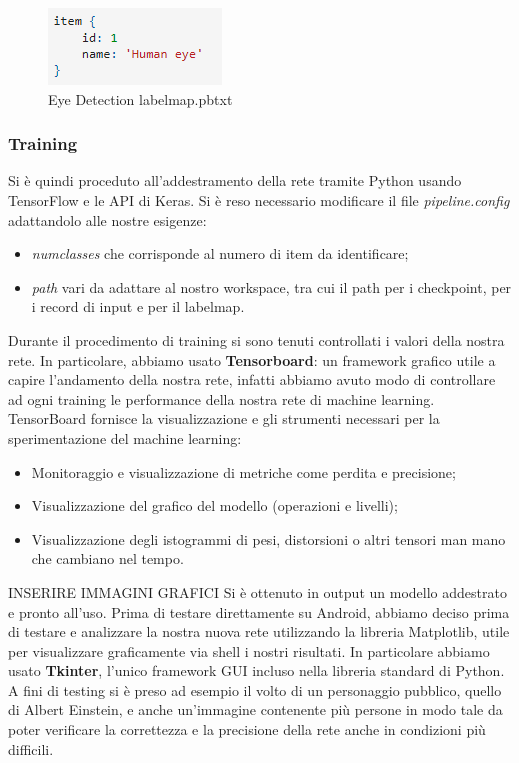 \documentclass[11pt]{article}
\begin{document}
\begin{figure}[h]
\caption{Eye Detection labelmap.pbtxt}
\centering
\includegraphics[scale=1]{img/item.png}
\end{figure}


\subsubsection{Training}
Si è quindi proceduto all’addestramento della rete tramite Python usando TensorFlow e le API di Keras. Si è reso necessario modificare il file \textit{pipeline.config} adattandolo alle nostre esigenze: 
\begin{itemize}
    \item \textit{numclasses} che corrisponde al numero di item da identificare;
    \item \textit{path} vari da adattare al nostro workspace, tra cui il path per i checkpoint, per i record di input e per il labelmap.
\end{itemize}
\newline
Durante il procedimento di training si sono tenuti controllati i valori della nostra rete. In particolare, abbiamo usato \textbf{Tensorboard}: un framework grafico utile a capire l'andamento della nostra rete, infatti abbiamo avuto modo di controllare ad ogni training le performance della nostra rete di machine learning.
\newline
TensorBoard fornisce la visualizzazione e gli strumenti necessari per la sperimentazione del machine learning:
\begin{itemize}
    \item Monitoraggio e visualizzazione di metriche come perdita e precisione;
    \item Visualizzazione del grafico del modello (operazioni e livelli);
    \item Visualizzazione degli istogrammi di pesi, distorsioni o altri tensori man mano che cambiano nel tempo.
\end{itemize}



INSERIRE IMMAGINI GRAFICI
\newline
Si è ottenuto in output un modello addestrato e pronto all’uso.
\newline \newline
Prima di testare direttamente su Android, abbiamo deciso prima di testare e analizzare la nostra nuova rete utilizzando la libreria Matplotlib, utile per visualizzare graficamente via shell i nostri risultati. In particolare abbiamo usato \textbf{Tkinter}, l'unico framework GUI incluso nella libreria standard di Python.
\newline
A fini di testing si è preso ad esempio il volto di un
personaggio pubblico, quello di Albert Einstein, e anche un'immagine contenente più persone in modo tale da poter verificare la correttezza e la precisione della rete anche in condizioni più difficili. 
\end{document}
